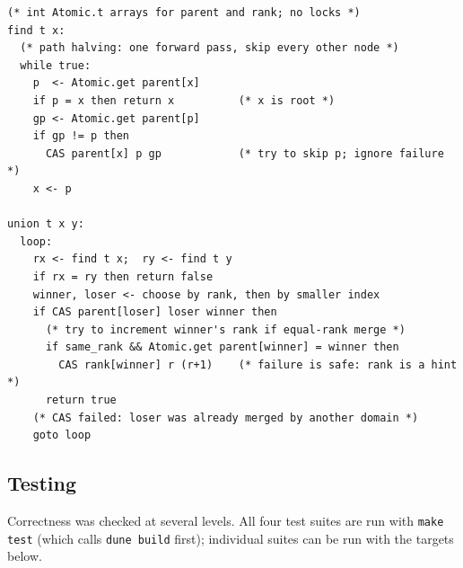 \documentclass[11pt,a4paper]{article}
\begin{document}
\begin{lstlisting}[caption={CAS \texttt{find} (path halving) and \texttt{union}.},label={lst:cas-pseudo}]
(* int Atomic.t arrays for parent and rank; no locks *)
find t x:
  (* path halving: one forward pass, skip every other node *)
  while true:
    p  <- Atomic.get parent[x]
    if p = x then return x          (* x is root *)
    gp <- Atomic.get parent[p]
    if gp != p then
      CAS parent[x] p gp            (* try to skip p; ignore failure *)
    x <- p

union t x y:
  loop:
    rx <- find t x;  ry <- find t y
    if rx = ry then return false
    winner, loser <- choose by rank, then by smaller index
    if CAS parent[loser] loser winner then
      (* try to increment winner's rank if equal-rank merge *)
      if same_rank && Atomic.get parent[winner] = winner then
        CAS rank[winner] r (r+1)    (* failure is safe: rank is a hint *)
      return true
    (* CAS failed: loser was already merged by another domain *)
    goto loop
\end{lstlisting}

\subsection{Testing}

Correctness was checked at several levels.  All four test suites are run with
\texttt{make test} (which calls \texttt{dune build} first); individual suites
can be run with the targets below.
\end{document}
